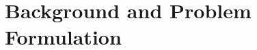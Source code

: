 \documentclass[conference]{IEEEconf}
\theoremstyle{plain}
\begin{document}



\section{Background and Problem Formulation}\label{sec:prob}
\end{document}
